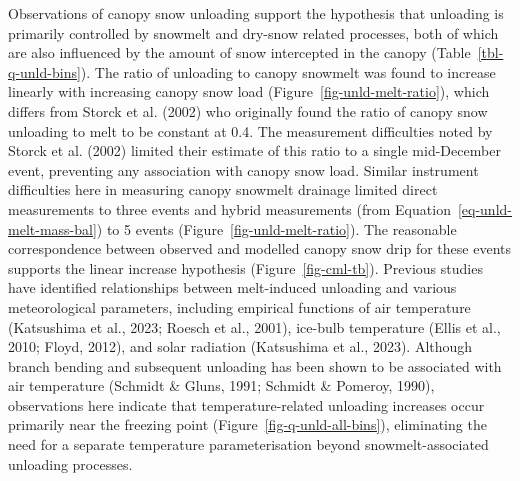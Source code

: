 \documentclass[
]{agujournal2019}
\begin{document}
Observations of canopy snow unloading support the hypothesis that
unloading is primarily controlled by snowmelt and dry-snow related
processes, both of which are also influenced by the amount of snow
intercepted in the canopy (Table~\ref{tbl-q-unld-bins}). The ratio of
unloading to canopy snowmelt was found to increase linearly with
increasing canopy snow load (Figure~\ref{fig-unld-melt-ratio}), which
differs from Storck et al. (2002) who originally found the ratio of
canopy snow unloading to melt to be constant at 0.4. The measurement
difficulties noted by Storck et al. (2002) limited their estimate of
this ratio to a single mid-December event, preventing any association
with canopy snow load. Similar instrument difficulties here in measuring
canopy snowmelt drainage limited direct measurements to three events and
hybrid measurements (from Equation~\ref{eq-unld-melt-mass-bal}) to 5
events (Figure~\ref{fig-unld-melt-ratio}). The reasonable correspondence
between observed and modelled canopy snow drip for these events supports
the linear increase hypothesis (Figure~\ref{fig-cml-tb}). Previous
studies have identified relationships between melt-induced unloading and
various meteorological parameters, including empirical functions of air
temperature (Katsushima et al., 2023; Roesch et al., 2001), ice-bulb
temperature (Ellis et al., 2010; Floyd, 2012), and solar radiation
(Katsushima et al., 2023). Although branch bending and subsequent
unloading has been shown to be associated with air temperature (Schmidt
\& Gluns, 1991; Schmidt \& Pomeroy, 1990), observations here indicate
that temperature-related unloading increases occur primarily near the
freezing point (Figure~\ref{fig-q-unld-all-bins}), eliminating the need
for a separate temperature parameterisation beyond snowmelt-associated
unloading processes.
\end{document}
